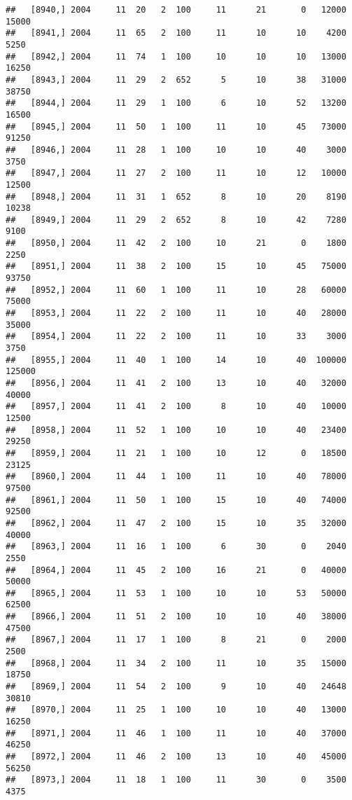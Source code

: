 \documentclass{article}\usepackage[]{graphicx}\usepackage[]{color}
\makeatletter
\newenvironment{kframe}{%
 \def\at@end@of@kframe{}%
 \ifinner\ifhmode%
  \def\at@end@of@kframe{\end{minipage}}%
  \begin{minipage}{\columnwidth}%
 \fi\fi%
 \def\FrameCommand##1{\hskip\@totalleftmargin \hskip-\fboxsep
 \colorbox{shadecolor}{##1}\hskip-\fboxsep
     \hskip-\linewidth \hskip-\@totalleftmargin \hskip\columnwidth}%
 \MakeFramed {\advance\hsize-\width
   \@totalleftmargin\z@ \linewidth\hsize
   \@setminipage}}%
 {\par\unskip\endMakeFramed%
 \at@end@of@kframe}
\newenvironment{knitrout}{}{} %
\makeatother
\begin{document}
\begin{knitrout}
\begin{kframe}
\begin{verbatim}
##   [8940,] 2004     11  20   2  100     11      21       0   12000   15000
##   [8941,] 2004     11  65   2  100     11      10      10    4200    5250
##   [8942,] 2004     11  74   1  100     10      10      10   13000   16250
##   [8943,] 2004     11  29   2  652      5      10      38   31000   38750
##   [8944,] 2004     11  29   1  100      6      10      52   13200   16500
##   [8945,] 2004     11  50   1  100     11      10      45   73000   91250
##   [8946,] 2004     11  28   1  100     10      10      40    3000    3750
##   [8947,] 2004     11  27   2  100     11      10      12   10000   12500
##   [8948,] 2004     11  31   1  652      8      10      20    8190   10238
##   [8949,] 2004     11  29   2  652      8      10      42    7280    9100
##   [8950,] 2004     11  42   2  100     10      21       0    1800    2250
##   [8951,] 2004     11  38   2  100     15      10      45   75000   93750
##   [8952,] 2004     11  60   1  100     11      10      28   60000   75000
##   [8953,] 2004     11  22   2  100     11      10      40   28000   35000
##   [8954,] 2004     11  22   2  100     11      10      33    3000    3750
##   [8955,] 2004     11  40   1  100     14      10      40  100000  125000
##   [8956,] 2004     11  41   2  100     13      10      40   32000   40000
##   [8957,] 2004     11  41   2  100      8      10      40   10000   12500
##   [8958,] 2004     11  52   1  100     10      10      40   23400   29250
##   [8959,] 2004     11  21   1  100     10      12       0   18500   23125
##   [8960,] 2004     11  44   1  100     11      10      40   78000   97500
##   [8961,] 2004     11  50   1  100     15      10      40   74000   92500
##   [8962,] 2004     11  47   2  100     15      10      35   32000   40000
##   [8963,] 2004     11  16   1  100      6      30       0    2040    2550
##   [8964,] 2004     11  45   2  100     16      21       0   40000   50000
##   [8965,] 2004     11  53   1  100     10      10      53   50000   62500
##   [8966,] 2004     11  51   2  100     10      10      40   38000   47500
##   [8967,] 2004     11  17   1  100      8      21       0    2000    2500
##   [8968,] 2004     11  34   2  100     11      10      35   15000   18750
##   [8969,] 2004     11  54   2  100      9      10      40   24648   30810
##   [8970,] 2004     11  25   1  100     10      10      40   13000   16250
##   [8971,] 2004     11  46   1  100     11      10      40   37000   46250
##   [8972,] 2004     11  46   2  100     13      10      40   45000   56250
##   [8973,] 2004     11  18   1  100     11      30       0    3500    4375

\end{verbatim}
\end{kframe}
\end{knitrout}
\end{document}
